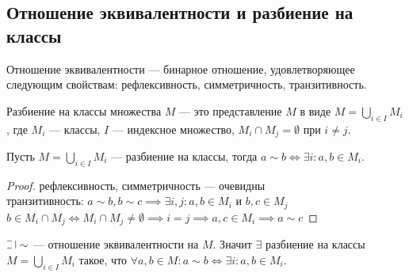 \begin{normalsize}
\section {Отношение эквивалентности и разбиение на классы}

\begin{defn}
    Отношение эквивалентности --- бинарное отношение, удовлетворяющее следующим свойствам: рефлексивность, симметричность, транзитивность.
\end{defn}

\begin{defn}
    Разбиение на классы множества $M$ --- это представление $M$ в виде $M = \bigcup\limits_{i \in I} M_i$, где $M_i$ --- классы, $I$ --- индексное множество, $M_i \cap M_j = \emptyset$ при $i \neq j$.
\end{defn}

\begin{theorem}
    Пусть $M = \bigcup\limits_{i \in I} M_i$ --- разбиение на классы, тогда $a \sim b \iff \exists i : a, b \in M_i$.
\end{theorem}

\begin{proof}
    рефлексивность, симметричность --- очевидны\\
    транзитивность: $a \sim b, b \sim c \implies \exists i, j : a, b \in M_i$ и $b, c \in M_j$\\
    $b \in M_i \cap M_j \iff M_i \cap M_j \neq \emptyset \implies i = j \implies a, c \in M_i \implies a \sim c$
\end{proof}

\begin{theorem}
    $\letus \sim$ --- отношение эквивалентности на $M$. Значит $\exists$ разбиение на классы $M = \bigcup\limits_{i \in I} M_i$ такое, что $\forall a, b \in M: a \sim b \iff \exists i : a, b \in M_i$.
\end{theorem}


\end{normalsize}
